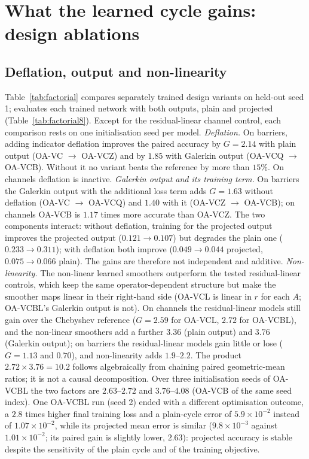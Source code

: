 \section{What the learned cycle gains: design ablations}\label{sec:design}

\subsection{Deflation, output and non-linearity}\label{sec:ablation}

Table~\ref{tab:factorial} compares separately trained design variants on held-out seed 1;  evaluates each
trained network with both outputs, plain and projected (Table~\ref{tab:factorial8}). Except for the residual-linear channel
control, each comparison rests on one initialisation seed per model.
\emph{Deflation.} On barriers, adding indicator deflation improves the paired accuracy by $G = 2.14$ with plain output
(OA-VC $\to$ OA-VCZ) and by $1.85$ with Galerkin output (OA-VCQ $\to$ OA-VCB). Without it no variant beats the reference by more
than $15\%$. On channels deflation is inactive.
\emph{Galerkin output and its training term.} On barriers the Galerkin output with the additional loss term adds $G = 1.63$
without deflation (OA-VC $\to$ OA-VCQ) and $1.40$ with it (OA-VCZ $\to$ OA-VCB); on channels OA-VCB is $1.17$ times more accurate
than OA-VCZ. The two components interact: without deflation, training for the projected output improves the projected output
($0.121\to0.107$) but degrades the plain one ($0.233\to0.311$); with deflation both improve ($0.049\to0.044$ projected,
$0.075\to0.066$ plain). The gains are therefore not independent and additive.
\emph{Non-linearity.} The non-linear learned smoothers outperform the tested residual-linear controls, which keep the same
operator-dependent structure but make the smoother maps linear in their right-hand side (OA-VCL is linear in $r$ for each
$A$; OA-VCBL's Galerkin output is not). On channels the residual-linear models still gain over the Chebyshev reference
($G = 2.59$ for OA-VCL, $2.72$ for OA-VCBL), and the non-linear smoothers add a further $3.36$ (plain output) and $3.76$ (Galerkin
output); on barriers the residual-linear models gain little or lose ($G = 1.13$ and $0.70$), and non-linearity adds $1.9$--$2.2$.
The product $2.72\times3.76 = 10.2$ follows algebraically from chaining paired geometric-mean ratios; it is not a causal
decomposition. Over three initialisation seeds of OA-VCBL the two factors are $2.63$--$2.72$ and $3.76$--$4.08$ (OA-VCB of the
same seed index). One OA-VCBL run (seed 2) ended with a different optimisation outcome, a $2.8$ times higher final training loss
and a plain-cycle error of $5.9\times10^{-2}$ instead of $1.07\times10^{-2}$, while its projected mean error is similar
($9.8\times10^{-3}$ against $1.01\times10^{-2}$; its paired gain is slightly lower, $2.63$): projected accuracy is stable despite
the sensitivity of the plain cycle and of the training objective.

